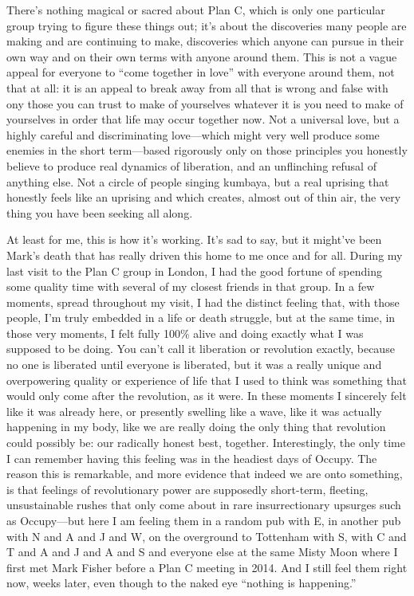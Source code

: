 \documentclass[a4paper,12pt,margin=.5in]{article}
\begin{document}
There's nothing magical or sacred about Plan C, which is only one
particular group trying to figure these things out; it's about the
discoveries many people are making and are continuing to make,
discoveries which anyone can pursue in their own way and on their own
terms with anyone around them. This is not a vague appeal for everyone
to ``come together in love'' with everyone around them, not that at all:
it is an appeal to break away from all that is wrong and false with ony
those you can trust to make of yourselves whatever it is you need to
make of yourselves in order that life may occur together now. Not a
universal love, but a highly careful and discriminating love---which
might very well produce some enemies in the short term---based
rigorously only on those principles you honestly believe to produce real
dynamics of liberation, and an unflinching refusal of anything else. Not
a circle of people singing kumbaya, but a real uprising that honestly
feels like an uprising and which creates, almost out of thin air, the
very thing you have been seeking all along.

At least for me, this is how it's working. It's sad to say, but it
might've been Mark's death that has really driven this home to me once
and for all. During my last visit to the Plan C group in London, I had
the good fortune of spending some quality time with several of my
closest friends in that group. In a few moments, spread throughout my
visit, I had the distinct feeling that, with those people, I'm truly
embedded in a life or death struggle, but at the same time, in those
very moments, I felt fully 100\% alive and doing exactly what I was
supposed to be doing. You can't call it liberation or revolution
exactly, because no one is liberated until everyone is liberated, but it
was a really unique and overpowering quality or experience of life that
I used to think was something that would only come after the revolution,
as it were. In these moments I sincerely felt like it was already here,
or presently swelling like a wave, like it was actually happening in my
body, like we are really doing the only thing that revolution could
possibly be: our radically honest best, together. Interestingly, the
only time I can remember having this feeling was in the headiest days of
Occupy. The reason this is remarkable, and more evidence that indeed we
are onto something, is that feelings of revolutionary power are
supposedly short-term, fleeting, unsustainable rushes that only come
about in rare insurrectionary upsurges such as Occupy---but here I am
feeling them in a random pub with E, in another pub with N and A and J
and W, on the overground to Tottenham with S, with C and T and A and J
and A and S and everyone else at the same Misty Moon where I first met
Mark Fisher before a Plan C meeting in 2014. And I still feel them right
now, weeks later, even though to the naked eye ``nothing is happening.''
\end{document}
